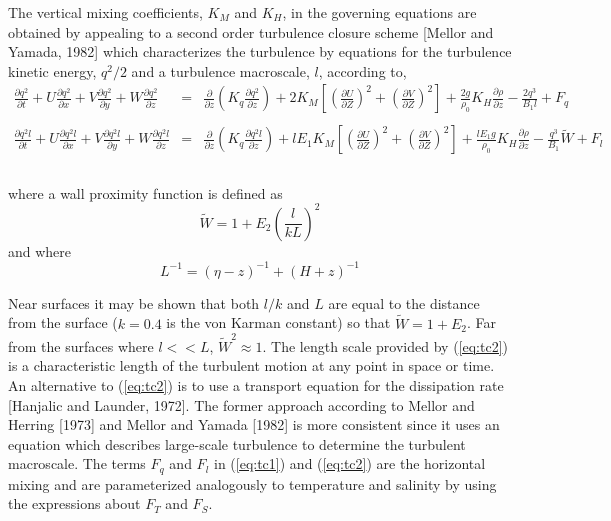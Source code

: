 \documentclass[oribibl]{llncs}
\begin{document}
The vertical mixing coefficients, $K_M$ and $K_H$, in the governing equations are obtained by appealing to a second order turbulence closure scheme [Mellor and Yamada, 1982] which characterizes the turbulence by equations for the turbulence kinetic energy, $q^2/2$ and a turbulence macroscale, $l$, according to,
\begin{eqnarray}
\frac{\partial q^2}{\partial t} + U\frac{\partial q^2}{\partial x} +V\frac{\partial q^2}{\partial y} + W\frac{\partial q^2}{\partial z}  &=& \frac{\partial}{\partial z} \left( K_q \frac{\partial q^2}{\partial z} \right)+2K_M\left[ \left( \frac{\partial U}{\partial Z}\right)^2 + \left( \frac{\partial V}{\partial Z}\right)^2 \right] + \frac{2g}{\rho_0}K_H\frac{\partial \rho}{\partial z} - \frac{2q^3}{B_1 l} + F_q \nonumber \\  \label{eq:tc1} \\   
\frac{\partial q^2 l}{\partial t} + U\frac{\partial q^2 l}{\partial x} +V\frac{\partial q^2 l}{\partial y} + W\frac{\partial q^2 l}{\partial z}   &=& \frac{\partial}{\partial z} \left( K_q \frac{\partial q^2 l}{\partial z} \right)+ l E_1 K_M\left[ \left( \frac{\partial U}{\partial Z}\right)^2 + \left( \frac{\partial V}{\partial Z}\right)^2 \right] + \frac{l E_1 g}{\rho_0}K_H\frac{\partial \rho}{\partial z} - \frac{q^3}{B_1} \widetilde{W} + F_l   \nonumber \\ \nonumber  \label{eq:tc2} \\ 
\end{eqnarray}

where a wall proximity function is defined as
\begin{equation}
\widetilde{W} = 1+E_2 \left( \frac{l}{kL} \right)^2
\end{equation}
and where
\begin{equation}
L^{-1} = (\eta-z)^{-1} + (H+z)^{-1}
\end{equation}

Near surfaces it may be shown that both $l/k$ and $L$ are equal to the distance from the surface ($k=0.4$ is the von Karman constant) so that $\widetilde{W}=1+E_2$. Far from the surfaces where $l << L$, $\widetilde{W}^2 \approx 1$. The length scale provided by (\ref{eq:tc2}) is a characteristic length of the turbulent motion at any point in space or time. An alternative to (\ref{eq:tc2}) is to use a transport equation for the dissipation rate [Hanjalic and Launder, 1972]. The former approach according to Mellor and Herring [1973] and Mellor and Yamada [1982] is more consistent since it uses an equation which describes large-scale turbulence to determine the turbulent macroscale. The terms $F_q$ and $F_l$ in  (\ref{eq:tc1}) and  (\ref{eq:tc2}) are the horizontal mixing and are parameterized analogously to temperature and salinity by using the expressions about $F_T$ and $F_S$.
\end{document}
